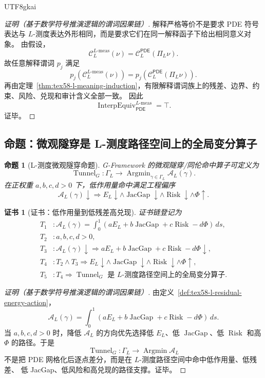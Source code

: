 \documentclass[12pt]{article}
\newtheorem{proposition}{命题}[section]
\newtheorem{Certificate}{证书}[section]
\newcommand{\GFramework}{\textsf{G-Framework}}
\newcommand{\PDE}{\ensuremath{\mathsf{PDE}}}
\DeclareMathOperator{\JacGap}{JacGap}
\DeclareMathOperator{\Risk}{Risk}
\DeclareMathOperator{\Tunnel}{Tunnel}
\DeclareMathOperator{\InterpEquiv}{InterpEquiv}
\newcommand{\Lmeas}{L\text{-}\mathrm{meas}}
\DeclareMathOperator*{\Argmin}{Argmin}
\begin{document}
\begin{CJK*}{UTF8}{gkai}
\begin{proof}[证明（基于数学符号推演逻辑的谓词因果链）]
解释严格等价不是要求 PDE 符号表达与 \(L\)-测度表达外形相同，而是要求它们在同一解释函子下给出相同意义对象。
由假设，
\[
  \mathcal C_L^{\Lmeas}(\nu)
  =
  \mathcal C_L^{\PDE}(\Pi_L\nu).
\]
故任意解释谓词 \(p_j\) 满足
\[
  p_j(\mathcal C_L^{\Lmeas}(\nu))
  =
  p_j(\mathcal C_L^{\PDE}(\Pi_L\nu)).
\]
再由定理~\ref{thm:tex58-l-meaning-induction}，有限解释谓词族上的残差、边界、约束、风险、兑现和审计含义全部一致。
因此
\[
  \InterpEquiv_{\PDE}^{\Lmeas}=\top.
\]
证毕。
\end{proof}

\subsection{命题：微观隧穿是 L-测度路径空间上的全局变分算子}
\label{subsec:tex58-tunnel-l-measure-proposition}

\begin{proposition}[L-测度微观隧穿命题]
\label{prop:tex58-tunnel-l-measure-operator}
\GFramework{} 的微观隧穿/同伦命中算子可定义为
\[
  \Tunnel_G:
  \Gamma_L
  \to
  \Argmin_{\gamma\in\Gamma_L}\mathcal A_L(\gamma).
\]
在正权重 \(a,b,c,d>0\) 下，低作用量命中满足工程偏序
\[
  \mathcal A_L(\gamma)\downarrow
  \Rightarrow
  E_L\downarrow
  \wedge
  \JacGap\downarrow
  \wedge
  \Risk\downarrow
  \wedge
  \Phi\uparrow.
\]
\end{proposition}

\begin{Certificate}[证书：低作用量到低残差高兑现]
\label{cert:tex58-tunnel-l-measure-operator}
证书链登记为
\[
\begin{aligned}
  T_1 &: \mathcal A_L(\gamma)
  =
  \int_0^1(aE_L+b\JacGap+c\Risk-d\Phi)\,ds,\\
  T_2 &: a,b,c,d>0,\\
  T_3 &: \mathcal A_L(\gamma)\downarrow
  \Rightarrow
  aE_L+b\JacGap+c\Risk-d\Phi\downarrow,\\
  T_4 &: T_2\wedge T_3
  \Rightarrow
  E_L\downarrow\wedge \JacGap\downarrow
  \wedge \Risk\downarrow\wedge \Phi\uparrow,\\
  T_5 &: T_4\Rightarrow
  \Tunnel_G\text{ 是 }L\text{-测度路径空间上的全局变分算子}.
\end{aligned}
\]
\end{Certificate}

\begin{proof}[证明（基于数学符号推演逻辑的谓词因果链）]
由定义~\ref{def:tex58-l-residual-energy-action}，
\[
  \mathcal A_L(\gamma)
  =
  \int_0^1(aE_L+b\JacGap+c\Risk-d\Phi)\,ds.
\]
当 \(a,b,c,d>0\) 时，降低 \(\mathcal A_L\) 的方向优先选择低 \(E_L\)、低 \(\JacGap\)、低 \(\Risk\)
和高 \(\Phi\) 的路径。于是
\[
  \Tunnel_G:
  \Gamma_L\to\Argmin\mathcal A_L
\]
不是把 PDE 网格化后逐点差分，而是在 \(L\)-测度路径空间中命中低作用量、低残差、
低 JacGap、低风险和高兑现的路径支撑。证毕。
\end{proof}


\end{CJK*}
\end{document}
